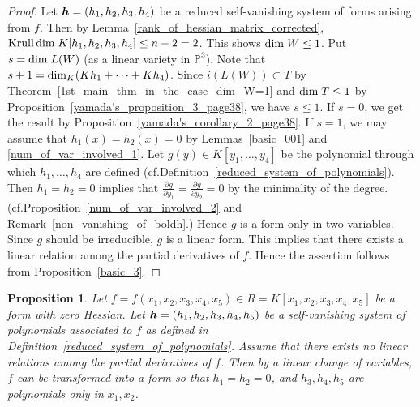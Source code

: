 \documentclass[12pt]{article}
\newtheorem{proposition}[theorem]{Proposition}
\theoremstyle{definition}
\theoremstyle{remark}
\def\dim{{\rm dim}}
\def\boldh{\mbox{\boldmath $h$}}
\def\pa{\partial}
\newcommand {\PP}{\mathbb{P}}
\begin{document}
\begin{proof}
Let $\boldh=(h_1, h_2, h_3, h_4)$ be a reduced self-vanishing system of forms arising from $f$.  
Then by Lemma~\ref{rank_of_hessian_matrix_corrected}, 
${\rm Krull\,dim} \;K[h_1, h_2, h_3, h_4] \leq n-2=2$. 
This shows $\dim \; W \leq 1$.  %
Put $s=\dim \; L(W)$ (as a linear variety in $\PP ^{3}$).  Note that $s+1=\dim _K (Kh_1 + \cdots + Kh_4)$.  
Since $i(L(W)) \subset T$ by Theorem~\ref{1st_main_thm_in_the_case_dim_W=1} and $\dim \; T \leq 1$ 
by Proposition~\ref{yamada's_proposition_3_page38}, we have $s \leq 1$. 
If $s=0$, we get the result by Proposition~\ref{yamada's_corollary_2_page38}. 
If $s=1$, we may assume that $h_1(x)=h_2(x)=0$ by Lemmas~\ref{basic_001} and \ref{num_of_var_involved_1}.
Let $g(y) \in K[y_1, \ldots, y_4]$ be the polynomial through which $h_1, \ldots, h_4$ 
are defined (cf.\@ Definition~\ref{reduced_system_of_polynomials}). 
Then $h_1=h_2=0$ implies that $\frac{\pa g}{\pa y_1}=\frac{\pa g}{\pa y_2}=0$ by the minimality of the degree.   
(cf.\@ Proposition~\ref{num_of_var_involved_2} and Remark~\ref{non_vanishing_of_boldh}.)  
Hence  $g$ is a form only in two variables.  Since $g$ should be irreducible, $g$ is a linear form.  
This implies that there exists a linear relation among the partial derivatives of $f$.  Hence the 
assertion follows from Proposition~\ref{basic_3}.
\end{proof}


\begin{proposition}   \label{svs_for_forms_with_zero_hessian_in_5_variables}  %
Let $f=f(x_1, x_2, x_3, x_4, x_5) \in R = K[x_1, x_2, x_3, x_4, x_5]$ be  a form with zero Hessian. 
Let $\boldh=(h_1, h_2, h_3, h_4, h_5)$ be a self-vanishing system of polynomials associated to $f$ 
as defined in Definition~\ref{reduced_system_of_polynomials}.   
Assume that there exists no linear relations among the partial derivatives of $f$.  
Then by a linear change of variables,  $f$ can be transformed into a form so that  
$h_1=h_2=0$, and $h_3, h_4, h_5$ are polynomials only in $x_1, x_2$.
\end{proposition}
\end{document}
